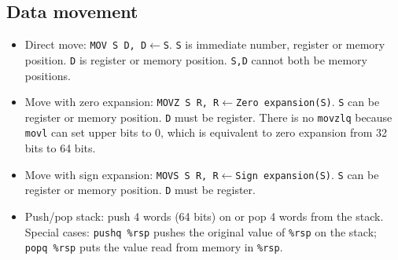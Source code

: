 \subsection{Data movement}
\begin{itemize}
\item Direct move: \texttt{MOV S D, D$\leftarrow$S}. \texttt{S} is immediate number, register or memory position. \texttt{D} is register or memory position. \texttt{S,D} cannot both be memory positions.
\item Move with zero expansion: \texttt{MOVZ S R, R$\leftarrow$Zero expansion(S)}. \texttt{S} can be register or memory position. \texttt{D} must be register. There is no \texttt{movzlq} because \texttt{movl} can set upper bits to 0, which is equivalent to zero expansion from 32 bits to 64 bits.
\item Move with sign expansion: \texttt{MOVS S R, R$\leftarrow$Sign expansion(S)}. \texttt{S} can be register or memory position. \texttt{D} must be register.
\item Push/pop stack: push 4 words (64 bits) on or pop 4 words from the stack. Special cases: \texttt{pushq \%rsp} pushes the original value of \texttt{\%rsp} on the stack; \texttt{popq \%rsp} puts the value read from memory in \texttt{\%rsp}.
\end{itemize}
